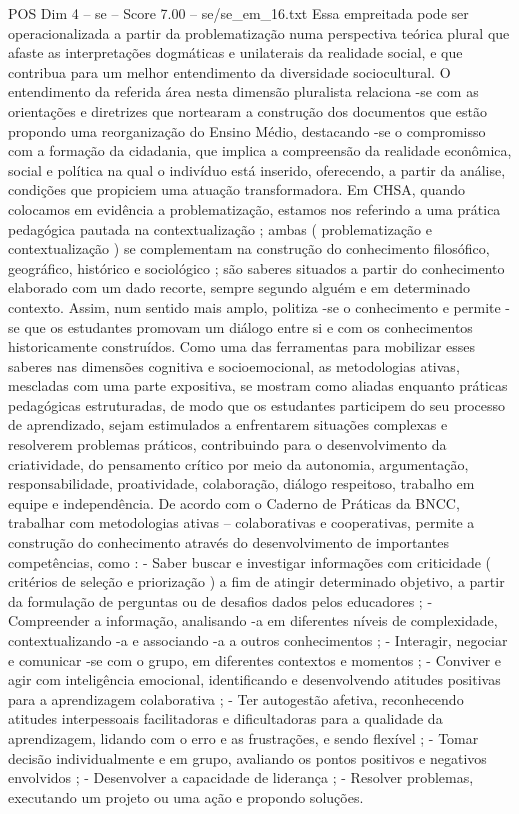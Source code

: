 \begin{textsample}{POS Dim 4 – se – Score 7.00 – se/se\_em\_16.txt}
Essa empreitada pode ser operacionalizada a partir da problematização numa perspectiva teórica plural que afaste as interpretações dogmáticas e unilaterais da realidade social, e que contribua para um melhor entendimento da diversidade sociocultural.
O entendimento da referida área nesta dimensão pluralista relaciona -se com as orientações e diretrizes que nortearam a construção dos documentos que estão propondo uma reorganização do Ensino Médio, destacando -se o compromisso com a formação da cidadania, que implica a compreensão da realidade econômica, social e política na qual o indivíduo está inserido, oferecendo, a partir da análise, condições que propiciem uma atuação transformadora.
Em CHSA, quando colocamos em evidência a problematização, estamos nos referindo a uma prática pedagógica pautada na contextualização ; ambas ( problematização e contextualização ) se complementam na construção do conhecimento filosófico, geográfico, histórico e sociológico ; são saberes situados a partir do conhecimento elaborado com um dado recorte, sempre segundo alguém e em determinado contexto.
Assim, num sentido mais amplo, politiza -se o conhecimento e permite -se que os estudantes promovam um diálogo entre si e com os conhecimentos historicamente construídos.
Como uma das ferramentas para mobilizar esses saberes nas dimensões cognitiva e socioemocional, as metodologias ativas, mescladas com uma parte expositiva, se mostram como aliadas enquanto práticas pedagógicas estruturadas, de modo que os estudantes participem do seu processo de aprendizado, sejam estimulados a enfrentarem situações complexas e resolverem problemas práticos, contribuindo para o desenvolvimento da criatividade, do pensamento crítico por meio da autonomia, argumentação, responsabilidade, proatividade, colaboração, diálogo respeitoso, trabalho em equipe e independência.
De acordo com o Caderno de Práticas da BNCC, trabalhar com metodologias ativas – colaborativas e cooperativas, permite a construção do conhecimento através do desenvolvimento de importantes competências, como : - Saber buscar e investigar informações com criticidade ( critérios de seleção e priorização ) a fim de atingir determinado objetivo, a partir da formulação de perguntas ou de desafios dados pelos educadores ; - Compreender a informação, analisando -a em diferentes níveis de complexidade, contextualizando -a e associando -a a outros conhecimentos ; - Interagir, negociar e comunicar -se com o grupo, em diferentes contextos e momentos ; - Conviver e agir com inteligência emocional, identificando e desenvolvendo atitudes positivas para a aprendizagem colaborativa ; - Ter autogestão afetiva, reconhecendo atitudes interpessoais facilitadoras e dificultadoras para a qualidade da aprendizagem, lidando com o erro e as frustrações, e sendo flexível ; - Tomar decisão individualmente e em grupo, avaliando os pontos positivos e negativos envolvidos ; - Desenvolver a capacidade de liderança ; - Resolver problemas, executando um projeto ou uma ação e propondo soluções.

\end{textsample}
